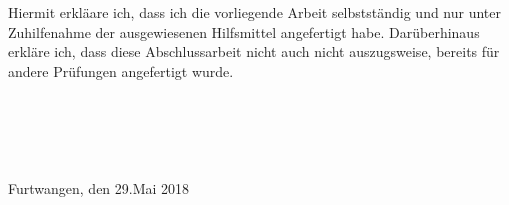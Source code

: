 
Hiermit erkläare ich, dass ich die vorliegende Arbeit selbstständig und nur unter Zuhilfenahme
der ausgewiesenen Hilfsmittel angefertigt habe. Darüberhinaus erkläre ich, dass
diese Abschlussarbeit nicht auch nicht auszugsweise, bereits für andere Prüfungen angefertigt
wurde.\\ \\ \\ \\ \\ \\
Furtwangen, den 29.Mai 2018